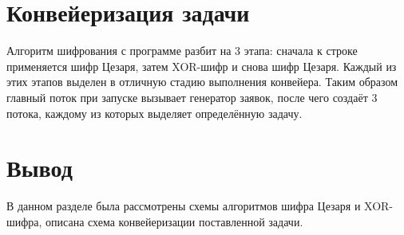 \section{Конвейеризация задачи}
\label{sec:conveyorisation}
Алгоритм шифрования с программе разбит на 3 этапа: сначала к строке применяется шифр Цезаря, затем XOR-шифр и снова шифр Цезаря. Каждый из этих этапов выделен в отличную стадию выполнения конвейера. Таким образом главный поток при запуске вызывает генератор заявок, после чего создаёт 3 потока, каждому из которых выделяет определённую задачу.


\section{Вывод}
\label{sec:design_conclusion}
В данном разделе была рассмотрены схемы алгоритмов шифра Цезаря и XOR-шифра, описана схема конвейеризации поставленной задачи.